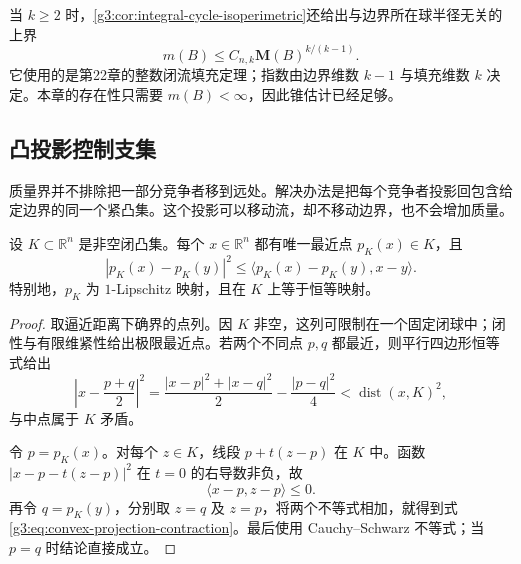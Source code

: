 当 \(k\ge2\) 时，\cref{g3:cor:integral-cycle-isoperimetric}还给出与边界所在球半径无关的上界
\[
	m(B)\le C_{n,k}\mathbf M(B)^{k/(k-1)}.
\]
它使用的是第22章的整数闭流填充定理；指数由边界维数 \(k-1\) 与填充维数 \(k\) 决定。本章的存在性只需要 \(m(B)<\infty\)，因此锥估计已经足够。

\subsection{凸投影控制支集}
\label{g3:subsec:2301:03}
质量界并不排除把一部分竞争者移到远处。解决办法是把每个竞争者投影回包含给定边界的同一个紧凸集。这个投影可以移动流，却不移动边界，也不会增加质量。

\begin{lemma}\label{g3:lem:convex-nearest-projection}
	设 \(K\subset\mathbb R^n\) 是非空闭凸集。每个 \(x\in\mathbb R^n\) 都有唯一最近点 \(p_K(x)\in K\)，且
	\begin{equation}\label{g3:eq:convex-projection-contraction}
		|p_K(x)-p_K(y)|^2\le
		\langle p_K(x)-p_K(y),x-y\rangle.
	\end{equation}
	特别地，\(p_K\) 为 \(1\)-Lipschitz 映射，且在 \(K\) 上等于恒等映射。
\end{lemma}
\begin{proof}
	取逼近距离下确界的点列。因 \(K\) 非空，这列可限制在一个固定闭球中；闭性与有限维紧性给出极限最近点。若两个不同点 \(p,q\) 都最近，则平行四边形恒等式给出
	\[
		\left|x-\frac{p+q}{2}\right|^2
		=\frac{|x-p|^2+|x-q|^2}{2}-\frac{|p-q|^2}{4}
		<\operatorname{dist}(x,K)^2,
	\]
	与中点属于 \(K\) 矛盾。

	令 \(p=p_K(x)\)。对每个 \(z\in K\)，线段 \(p+t(z-p)\) 在 \(K\) 中。函数 \(|x-p-t(z-p)|^2\) 在 \(t=0\) 的右导数非负，故
	\[
		\langle x-p,z-p\rangle\le0.
	\]
	再令 \(q=p_K(y)\)，分别取 \(z=q\) 及 \(z=p\)，将两个不等式相加，就得到式\eqref{g3:eq:convex-projection-contraction}。最后使用 Cauchy--Schwarz 不等式；当 \(p=q\) 时结论直接成立。
\end{proof}


